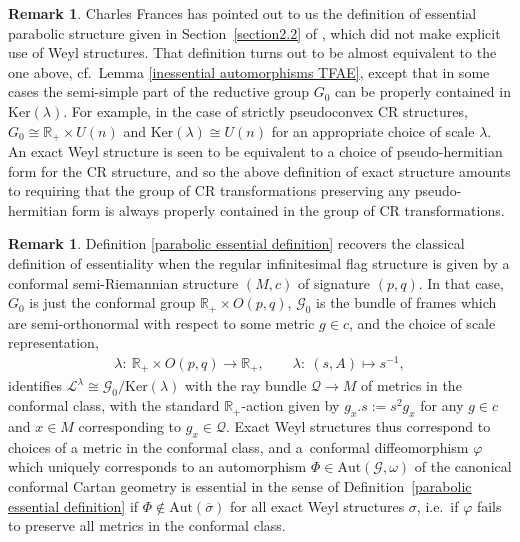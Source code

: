 \documentclass[pdftex]{sigma}
\def\R{\mathbb{R}}
\def\Gbdle{\mathcal{G}}
\def\isom{\cong}
\theoremstyle{plain}
\theoremstyle{definition}
\newtheorem{Remark}[Definition]{Remark}
\begin{document}
\begin{Remark} Charles Frances has pointed out to us the def\/inition of essential parabolic structure given in Section~\ref{section2.2} of \cite{FrEss}, which did not make explicit use of Weyl structures. That def\/inition turns out to be almost equivalent to the one above, cf.\ Lemma \ref{inessential automorphisms TFAE}, except that in some cases the semi-simple part of the reductive group $G_0$ can be properly contained in $\mathrm{Ker}(\lambda)$. For example, in the case of strictly pseudoconvex CR structures, $G_0 \isom \R_+ \times U(n)$ and $\mathrm{Ker}(\lambda) \isom U(n)$ for an appropriate choice of scale $\lambda$. An exact Weyl structure is seen to be equivalent to a choice of pseudo-hermitian form for the CR structure, and so the above def\/inition of exact structure amounts to requiring that the group of CR transformations preserving any pseudo-hermitian form is always properly contained in the group of CR transformations.
\end{Remark}

\begin{Remark} Def\/inition \ref{parabolic essential definition} recovers the classical def\/inition of essentiality when the regular inf\/initesimal f\/lag structure is given by a conformal semi-Riemannian structure $(M,c)$ of signature $(p,q)$. In that case, $G_0$ is just the conformal group $\R_+ \times O(p,q)$, $\Gbdle_0$ is the bundle of frames which are semi-orthonormal with respect to some metric $g \in c$, and the choice of scale representation,
\begin{gather*}
 \lambda: \ \R_+ \times O(p,q) \rightarrow \R_+, \qquad
 \lambda: \ (s,A) \mapsto s^{-1},
\end{gather*}
identif\/ies $\mathcal{L}^{\lambda} \isom \Gbdle_0/\mathrm{Ker}(\lambda)$ with the ray bundle $\mathcal{Q} \rightarrow M$ of metrics in the conformal class, with the standard $\R_+$-action given by $g_x.s := s^2g_x$ for any $g \in c$ and $x \in M$ corresponding to $g_x \in \mathcal{Q}$. Exact Weyl structures thus correspond to choices of a metric in the conformal class, and a~conformal dif\/feomorphism $\varphi$ which uniquely corresponds to an automorphism $\Phi \in \mathrm{Aut}(\Gbdle,\omega)$ of the canonical conformal Cartan geometry is essential in the sense of Def\/inition~\ref{parabolic essential definition} if $\Phi \notin \mathrm{Aut}(\overline{\sigma})$ for all exact Weyl structures $\sigma$, i.e.\ if $\varphi$ fails to preserve all metrics in the conformal class.
\end{Remark}
\end{document}
